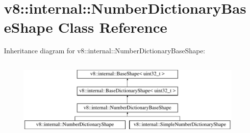 \hypertarget{classv8_1_1internal_1_1NumberDictionaryBaseShape}{}\section{v8\+:\+:internal\+:\+:Number\+Dictionary\+Base\+Shape Class Reference}
\label{classv8_1_1internal_1_1NumberDictionaryBaseShape}
Inheritance diagram for v8\+:\+:internal\+:\+:Number\+Dictionary\+Base\+Shape\+:\begin{figure}[H]
\begin{center}
\leavevmode
\includegraphics[height=4.000000cm]{classv8_1_1internal_1_1NumberDictionaryBaseShape}
\end{center}
\end{figure}
